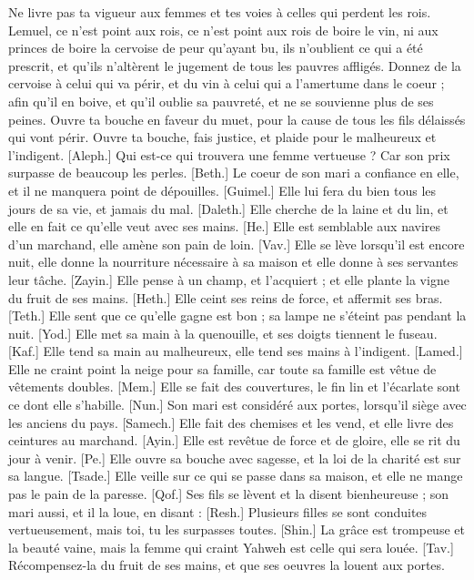 \begin{multicols}{2}
Ne livre pas ta vigueur aux femmes et tes voies à celles qui perdent les rois.
Lemuel, ce n'est point aux rois, ce n'est point aux rois de boire le vin, ni aux princes de boire la cervoise
de peur qu'ayant bu, ils n'oublient ce qui a été prescrit, et qu'ils n'altèrent le jugement de tous les pauvres affligés.
Donnez de la cervoise à celui qui va périr, et du vin à celui qui a l'amertume dans le coeur ;
afin qu'il en boive, et qu'il oublie sa pauvreté, et ne se souvienne plus de ses peines.
Ouvre ta bouche en faveur du muet, pour la cause de tous les fils délaissés qui vont périr.
Ouvre ta bouche, fais justice, et plaide pour le malheureux et l'indigent.
[Aleph.] Qui est-ce qui trouvera une femme vertueuse ? Car son prix surpasse de beaucoup les perles.
[Beth.] Le coeur de son mari a confiance en elle, et il ne manquera point de dépouilles.
[Guimel.] Elle lui fera du bien tous les jours de sa vie, et jamais du mal.
[Daleth.] Elle cherche de la laine et du lin, et elle en fait ce qu'elle veut avec ses mains.
[He.] Elle est semblable aux navires d'un marchand, elle amène son pain de loin.
[Vav.] Elle se lève lorsqu'il est encore nuit, elle donne la nourriture nécessaire à sa maison et elle donne à ses servantes leur tâche.
[Zayin.] Elle pense à un champ, et l'acquiert ; et elle plante la vigne du fruit de ses mains.
[Heth.] Elle ceint ses reins de force, et affermit ses bras.
[Teth.] Elle sent que ce qu'elle gagne est bon ; sa lampe ne s'éteint pas pendant la nuit.
[Yod.] Elle met sa main à la quenouille, et ses doigts tiennent le fuseau.
[Kaf.] Elle tend sa main au malheureux, elle tend ses mains à l'indigent.
[Lamed.] Elle ne craint point la neige pour sa famille, car toute sa famille est vêtue de vêtements doubles.
[Mem.] Elle se fait des couvertures, le fin lin et l'écarlate sont ce dont elle s'habille.
[Nun.] Son mari est considéré aux portes, lorsqu'il siège avec les anciens du pays.
[Samech.] Elle fait des chemises et les vend, et elle livre des ceintures au marchand.
[Ayin.] Elle est revêtue de force et de gloire, elle se rit du jour à venir.
[Pe.] Elle ouvre sa bouche avec sagesse, et la loi de la charité est sur sa langue.
[Tsade.] Elle veille sur ce qui se passe dans sa maison, et elle ne mange pas le pain de la paresse.
[Qof.] Ses fils se lèvent et la disent bienheureuse ; son mari aussi, et il la loue, en disant :
[Resh.] Plusieurs filles se sont conduites vertueusement, mais toi, tu les surpasses toutes.
[Shin.] La grâce est trompeuse et la beauté vaine, mais la femme qui craint Yahweh est celle qui sera louée.
[Tav.] Récompensez-la du fruit de ses mains, et que ses oeuvres la louent aux portes.
\PPE{}
\end{multicols}
